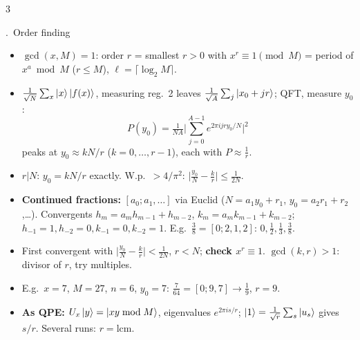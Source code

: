 \documentclass[8pt,a4paper]{extarticle}
\newcounter{sec}\newcounter{ssec}[sec]
\newcommand{\sect}[1]{\stepcounter{sec}\par\vspace{2pt}\noindent\colorbox{hd}{\parbox{\dimexpr\linewidth-2\fboxsep}{\color{white}\bfseries\strut\arabic{sec}.\ #1}}\par\vspace{0.5pt}}
\begin{document}
\begin{multicols}{3}
\sect{Order finding}
\begin{itemize}
\item $\gcd(x,M)=1$: order $r$ = smallest $r>0$ with $x^r\equiv1\pmod M$ = period of $x^a\bmod M$ ($r\le M$), $\ell=\lceil\log_2M\rceil$.
\item $\frac1{\sqrt N}\sum_x\ket x\ket{f(x)}$, measuring reg.\ 2 leaves $\frac1{\sqrt A}\sum_j\ket{x_0+jr}$; QFT, measure $y_0$:
\[P(y_0)=\tfrac1{NA}\Big|\textstyle\sum_{j=0}^{A-1}e^{2\pi ijry_0/N}\Big|^2\]
peaks at $y_0\approx kN/r$ ($k=0,\dots,r{-}1$), each with $P\approx\frac1r$.
\item $r|N$: $y_0=kN/r$ exactly. W.p.\ $>4/\pi^2$: $\big|\frac{y_0}N-\frac kr\big|\le\frac1{2N}$.
\item \textbf{Continued fractions:} $[a_0;a_1,\dots]$ via Euclid ($N=a_1y_0+r_1$, $y_0=a_2r_1+r_2$,\dots). Convergents $h_m=a_mh_{m-1}+h_{m-2}$, $k_m=a_mk_{m-1}+k_{m-2}$; $h_{-1}=1,h_{-2}=0,k_{-1}=0,k_{-2}=1$. E.g.\ $\frac38=[0;2,1,2]$: $0,\frac12,\frac13,\frac38$.
\item First convergent with $\big|\frac{y_0}N-\frac kr\big|<\frac1{2N}$, $r<N$; \textbf{check $x^r\equiv1$}. $\gcd(k,r)>1$: divisor of $r$, try multiples.
\item E.g.\ $x=7$, $M=27$, $n=6$, $y_0=7$: $\frac7{64}=[0;9,7]\to\frac19$, $r=9$.
\item \textbf{As QPE:} $U_x\ket y=\ket{xy\bmod M}$, eigenvalues $e^{2\pi is/r}$; $\ket1=\frac1{\sqrt r}\sum_s\ket{u_s}$ gives $s/r$. Several runs: $r=\mathrm{lcm}$.
\end{itemize}


\end{multicols}
\end{document}
